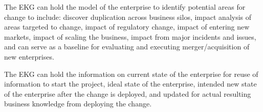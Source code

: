 The EKG can hold the model of the enterprise to identify potential areas for change to include:
discover duplication across business silos, impact analysis of areas targeted to change,
impact of regulatory change, impact of entering new markets, impact of scaling the business,
impact from major incidents and issues, and can serve as a baseline for evaluating and executing
merger/acquisition of new enterprises.

The EKG can hold the information  on current state of the enterprise for reuse of information to start the project,
ideal state of the enterprise, intended new state of the enterprise after the change is deployed,
and updated for actual resulting business knowledge from deploying the change.
